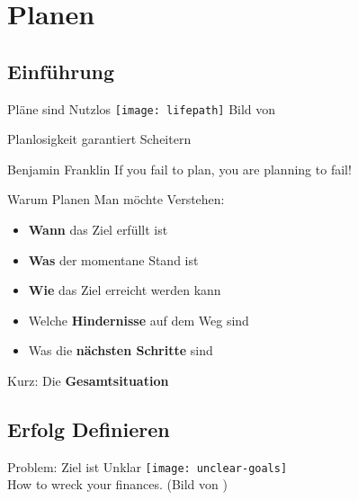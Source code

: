 \section{Planen}


\subsection{Einführung}

\begin{frame}[c]{Pläne sind Nutzlos}
    \normalsize
    \texttt{[image: lifepath]}
    Bild von \cite{lifepath-pic}
\end{frame}


\begin{frame}[c]{Planlosigkeit garantiert Scheitern}
    \begin{aquote}{Benjamin Franklin}
        If you fail to plan, you are planning to fail!
    \end{aquote}
\end{frame}

\begin{frame}[c]{Warum Planen}
    \large
    Man möchte Verstehen:
    \begin{itemize}[<+(1)->]
        \item \textbf{Wann} das Ziel erfüllt ist
        \item \textbf{Was} der momentane Stand ist
        \item \textbf{Wie} das Ziel erreicht werden kann
        \item Welche \textbf{Hindernisse} auf dem Weg sind
        \item Was die \textbf{nächsten Schritte} sind
    \end{itemize}
    \pause
    Kurz: Die \textbf{Gesamtsituation}
\end{frame}


\subsection{Erfolg Definieren}


\begin{frame}[c]{Problem: Ziel ist Unklar}
    \normalsize
    \texttt{[image: unclear-goals]} \\
    How to wreck your finances. (Bild von \cite{unclear-goals-pic})
\end{frame}


